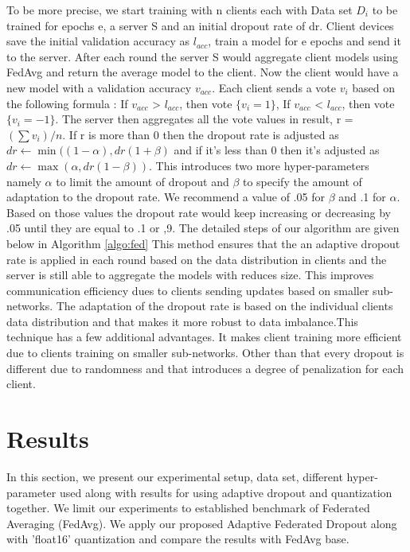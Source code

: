\documentclass{article}
\begin{document}
To be more precise, we start training with n clients each with Data set $D_{i}$ to be trained for epochs e, a server S and an initial dropout rate of dr. Client devices save the initial validation accuracy as $l_{acc}$, train a model for e epochs and send it to the server. After each round the server S would aggregate client models using FedAvg and return the average model to the client. Now the client would have a new model with a validation accuracy $v_{acc}$. Each client sends a vote $v_{i}$ based on the following formula : If $v_{acc}$ > $l_{acc}$, then vote $\{ v_{i} = 1 \}$, If $v_{acc}$ < $l_{acc}$, then vote $\{ v_{i} = -1 \}$.  The server then aggregates all the vote values in result, r = $(\sum v_{i}) / n$. If r is more than 0 then the dropout rate is adjusted as $dr \gets \min(( 1 - \alpha), dr(1+\beta )$ and if it's less than 0 then it's adjusted as $dr \gets \max(\alpha, dr(1-\beta) )$. This introduces two more hyper-parameters namely $\alpha$ to limit the amount of dropout and $\beta$ to specify the amount of adaptation to the dropout rate. We recommend a value of .05 for $\beta$ and .1 for $\alpha$. Based on those values the dropout rate would keep increasing or decreasing by .05 until they are equal to .1 or ,9. The detailed steps of our algorithm are given below in Algorithm \ref{algo:fed} This method ensures that the an adaptive dropout rate is applied in each round based on the data distribution in clients and the server is still able to aggregate the models with reduces size.
This improves communication efficiency dues to clients sending updates based on smaller sub-networks. The adaptation of the dropout rate is based on the individual clients data distribution and that makes it more robust to data imbalance.This technique has a few additional advantages. It makes client training more efficient due to clients training on smaller sub-networks. Other than that every dropout is different due to randomness and that introduces a degree of penalization for each client.


\section{Results}

In this section, we present our experimental setup, data set, different hyper-parameter used along with results for using adaptive dropout and quantization together. We limit our experiments to established benchmark of Federated Averaging (FedAvg). We apply our proposed Adaptive Federated Dropout along with 'float16' quantization and compare the results with FedAvg base.
\end{document}
